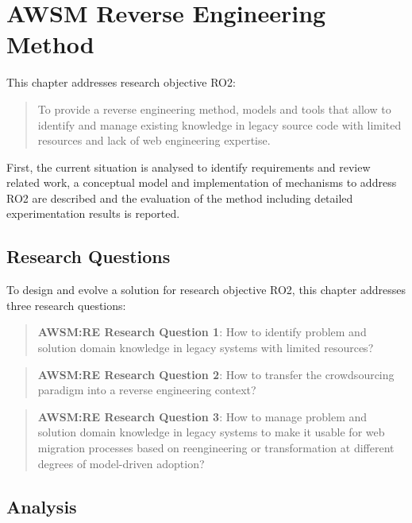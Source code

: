 \hypertarget{sec:awsm-re}{%
\chapter{AWSM Reverse Engineering Method}\label{sec:awsm-re}}

This chapter addresses research objective RO2:

\begin{quote}
To provide a reverse engineering method, models and tools that allow to identify and manage existing knowledge in legacy source code with limited resources and lack of web engineering expertise.
\end{quote}

First, the current situation is analysed to identify requirements and review related work, a conceptual model and implementation of mechanisms to address RO2 are described and the evaluation of the method including detailed experimentation results is reported.

\hypertarget{research-questions}{%
\section{Research Questions}\label{research-questions}}

To design and evolve a solution for research objective RO2, this chapter addresses three research questions:

\begin{quote}
\textbf{AWSM:RE Research Question 1}: How to identify problem and solution domain knowledge in legacy systems with limited resources?
\end{quote}

\begin{quote}
\textbf{AWSM:RE Research Question 2}: How to transfer the crowdsourcing paradigm into a reverse engineering context?
\end{quote}

\begin{quote}
\textbf{AWSM:RE Research Question 3}: How to manage problem and solution domain knowledge in legacy systems to make it usable for web migration processes based on reengineering or transformation at different degrees of model-driven adoption?
\end{quote}

\hypertarget{analysis}{%
\section{Analysis}\label{analysis}}

